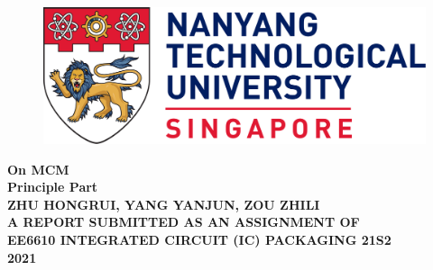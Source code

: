 \begin{titlepage}
	
	\begin{figure}[h!]
		\centering
		\includegraphics[width=1\textwidth]{Title/NTU_logo.png}
		\caption*{}
		\label{fig:entropy} 
	\end{figure}
	
	\vspace{1.5in}
	
	\centering
	\Huge{\textbf{On MCM\\Principle Part}}\\[2.5in]
	
	\normalsize{\textbf{ZHU HONGRUI, YANG YANJUN, ZOU ZHILI}}\\[0.5in]
	
	
	\textbf{A REPORT SUBMITTED AS AN ASSIGNMENT OF\\EE6610 INTEGRATED CIRCUIT (IC) PACKAGING 21S2}\\[0.25in]
	
	\large{\textbf{2021}}
\end{titlepage}
\newpage